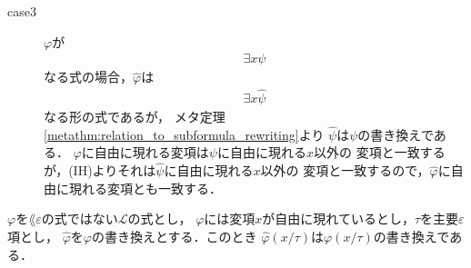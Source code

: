 \begin{metaprf}
\begin{description}
\begin{description}
					\item[case3] $\varphi$が
						\begin{align}
							\exists x \psi
						\end{align}
						なる式の場合，$\widehat{\varphi}$は
						\begin{align}
							\exists x \widehat{\psi}
						\end{align}
						なる形の式であるが，
						メタ定理\ref{metathm:relation_to_subformula_rewriting}より
						$\widehat{\psi}$は$\psi$の書き換えである．
						$\varphi$に自由に現れる変項は$\psi$に自由に現れる$x$以外の
						変項と一致するが，(IH)よりそれは$\widehat{\psi}$に自由に現れる$x$以外の
						変項と一致するので，$\widehat{\varphi}$に自由に現れる変項とも一致する．
						\QED
				\end{description}
		\end{description}
	\end{metaprf}
	
	\begin{screen}
		\begin{metathm}[書き換えへの代入は代入した式の書き換え]
		\label{metathm:substitution_to_rewritten_formula}
			$\varphi$を$\lang{\varepsilon}$の式ではない$\mathcal{L}$の式とし，
			$\varphi$には変項$x$が自由に現れているとし，$\tau$を主要$\varepsilon$項とし，
			$\widehat{\varphi}$を$\varphi$の書き換えとする．このとき
			$\widehat{\varphi}(x/\tau)$は$\varphi(x/\tau)$の書き換えである．
		\end{metathm}
	\end{screen}
	

